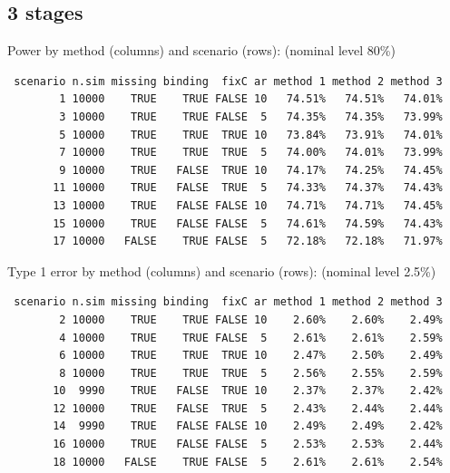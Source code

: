 \documentclass[12pt]{article}
\begin{document}
\clearpage

\subsection{3 stages}
\label{sec:org726f094}

Power by method (columns) and scenario (rows): \hfill (nominal level 80\%)
\begin{verbatim}
 scenario n.sim missing binding  fixC ar method 1 method 2 method 3
        1 10000    TRUE    TRUE FALSE 10   74.51%   74.51%   74.01%
        3 10000    TRUE    TRUE FALSE  5   74.35%   74.35%   73.99%
        5 10000    TRUE    TRUE  TRUE 10   73.84%   73.91%   74.01%
        7 10000    TRUE    TRUE  TRUE  5   74.00%   74.01%   73.99%
        9 10000    TRUE   FALSE  TRUE 10   74.17%   74.25%   74.45%
       11 10000    TRUE   FALSE  TRUE  5   74.33%   74.37%   74.43%
       13 10000    TRUE   FALSE FALSE 10   74.71%   74.71%   74.45%
       15 10000    TRUE   FALSE FALSE  5   74.61%   74.59%   74.43%
       17 10000   FALSE    TRUE FALSE  5   72.18%   72.18%   71.97%
\end{verbatim}

\bigskip

Type 1 error by method (columns) and scenario (rows): \hfill (nominal level 2.5\%)
\begin{verbatim}
 scenario n.sim missing binding  fixC ar method 1 method 2 method 3
        2 10000    TRUE    TRUE FALSE 10    2.60%    2.60%    2.49%
        4 10000    TRUE    TRUE FALSE  5    2.61%    2.61%    2.59%
        6 10000    TRUE    TRUE  TRUE 10    2.47%    2.50%    2.49%
        8 10000    TRUE    TRUE  TRUE  5    2.56%    2.55%    2.59%
       10  9990    TRUE   FALSE  TRUE 10    2.37%    2.37%    2.42%
       12 10000    TRUE   FALSE  TRUE  5    2.43%    2.44%    2.44%
       14  9990    TRUE   FALSE FALSE 10    2.49%    2.49%    2.42%
       16 10000    TRUE   FALSE FALSE  5    2.53%    2.53%    2.44%
       18 10000   FALSE    TRUE FALSE  5    2.61%    2.61%    2.54%
\end{verbatim}

\clearpage
\end{document}
